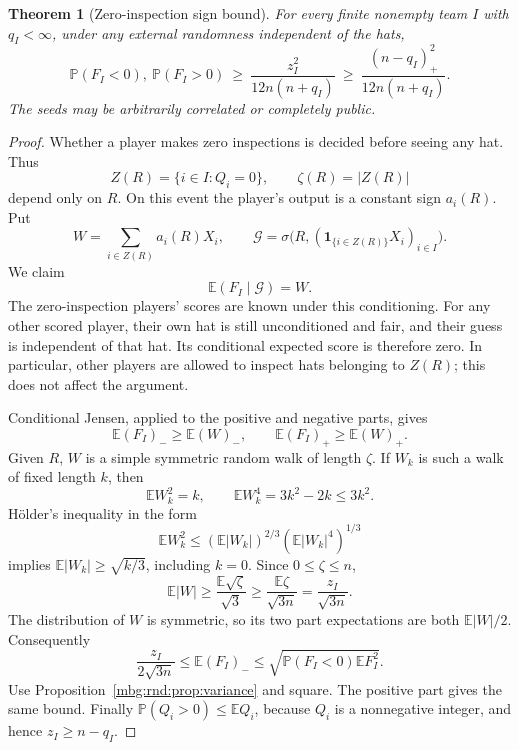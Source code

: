 \documentclass[11pt,letterpaper]{article}
\newtheorem{theorem}{Theorem}[section]
\theoremstyle{definition}
\newcommand{\E}{\mathbb E}
\newcommand{\Prb}{\mathbb P}
\newcommand{\ind}{\mathbf 1}
\newcommand{\pos}[1]{\left(#1\right)_{+}}
\newcommand{\negpart}[1]{\left(#1\right)_{-}}
\begin{document}
\begin{theorem}[Zero-inspection sign bound]
\label{mbg:rnd:thm:zero}
For every finite nonempty team $I$ with $q_I<\infty$, under any external
randomness independent of the hats,
\begin{equation}
 \Prb(F_I<0),\ \Prb(F_I>0)
 \ \ge\ \frac{z_I^2}{12n(n+q_I)}
 \ \ge\ \frac{(n-q_I)_+^2}{12n(n+q_I)}.
 \label{mbg:rnd:eq:zero-bound}
\end{equation}
The seeds may be arbitrarily correlated or completely public.
\end{theorem}
\begin{proof}
Whether a player makes zero inspections is decided before seeing any
hat. Thus
\[
 Z(R)=\{i\in I:Q_i=0\},\qquad \zeta(R)=|Z(R)|
\]
depend only on $R$. On this event the player's output is a constant
sign $a_i(R)$. Put
\[
 W=\sum_{i\in Z(R)}a_i(R)X_i,
 \qquad
 \mathcal G=\sigma\bigl(R,(\ind_{\{i\in Z(R)\}}X_i)_{i\in I}\bigr).
\]
We claim
\begin{equation}
 \E(F_I\mid\mathcal G)=W.
 \label{mbg:rnd:eq:zero-projection}
\end{equation}
The zero-inspection players' scores are known under this conditioning.
For any other scored player, their own hat is still unconditioned and
fair, and their guess is independent of that hat. Its conditional
expected score is therefore zero. In particular, other players are
allowed to inspect hats belonging to $Z(R)$; this does not affect the
argument.

Conditional Jensen, applied to the positive and negative parts, gives
\[
 \E\negpart{F_I}\ge\E\negpart{W},\qquad
 \E\pos{F_I}\ge\E\pos{W}.
\]
Given $R$, $W$ is a simple symmetric random walk of length $\zeta$. If
$W_k$ is such a walk of fixed length $k$, then
\[
 \E W_k^2=k,\qquad \E W_k^4=3k^2-2k\le3k^2.
\]
H\"older's inequality in the form
\[
 \E W_k^2\le(\E|W_k|)^{2/3}(\E|W_k|^4)^{1/3}
\]
implies $\E|W_k|\ge\sqrt{k/3}$, including $k=0$. Since $0\le \zeta\le n$,
\[
 \E|W|\ge\frac{\E\sqrt \zeta}{\sqrt3}
 \ge\frac{\E \zeta}{\sqrt{3n}}=\frac{z_I}{\sqrt{3n}}.
\]
The distribution of $W$ is symmetric, so its two part expectations are
both $\E|W|/2$. Consequently
\[
 \frac{z_I}{2\sqrt{3n}}
 \le\E\negpart{F_I}
 \le\sqrt{\Prb(F_I<0)\E F_I^2}.
\]
Use Proposition~\ref{mbg:rnd:prop:variance} and square. The positive part gives the same
bound. Finally $\Prb(Q_i>0)\le\E Q_i$, because $Q_i$ is a nonnegative
integer, and hence $z_I\ge n-q_I$.
\end{proof}
\end{document}
